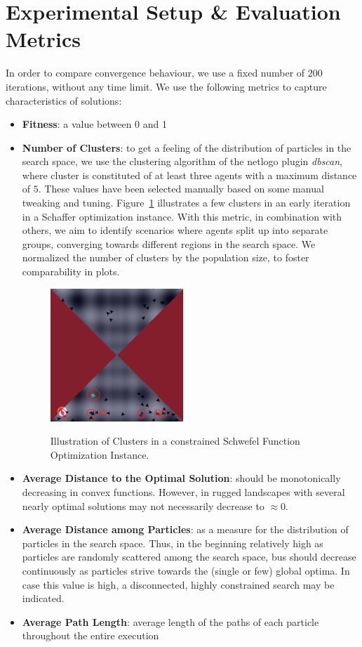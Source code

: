 \documentclass[12pt]{article}
\begin{document}
\section{Experimental Setup \& Evaluation Metrics}
In order to compare convergence behaviour, we use a fixed number of $200$ iterations, without any time limit. 
We use the following metrics to capture characteristics of solutions:
\begin{itemize}
	\item \textbf{Fitness}: a value between 0 and 1
	\item \textbf{Number of Clusters}: to get a feeling of the distribution of particles in the search space, we use the clustering algorithm of the netlogo plugin \emph{dbscan}, where cluster is constituted of at least three agents with a maximum distance of $5$. These values have been selected manually based on some manual tweaking and tuning. Figure~\ref{fig:clusters} illustrates a few clusters in an early iteration in a Schaffer optimization instance. With this metric, in combination with others, we aim to identify scenarios where agents split up into separate groups, converging towards different regions in the search space. We normalized the number of clusters by the population size, to foster comparability in plots. 
	
	\begin{figure}[h]
	\centering
		\includegraphics[width=5cm]{figures/clusters.png}
		\label{fig:clusters}
		\caption{Illustration of Clusters in a constrained Schwefel Function Optimization Instance.}
	\end{figure}	
	
	\item \textbf{Average Distance to the Optimal Solution}: should be monotonically decreasing in convex functions. However, in rugged landscapes with several nearly optimal solutions may not necessarily decrease to $\approx 0$.
	\item \textbf{Average Distance among Particles}: as a measure for the distribution of particles in the search space. Thus, in the beginning relatively high as particles are randomly scattered among the search space, bus should decrease continuously as particles strive towards the (single or few) global optima. In case this value is high, a disconnected, highly constrained search may be indicated. 
	\item \textbf{Average Path Length}: average length of the paths of each particle throughout the entire execution
		
\end{itemize}
\end{document}
